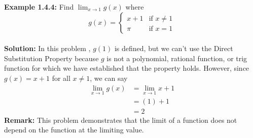 \documentclass{article}
\begin{document}
	\textbf{Example 1.4.4:} Find $\lim_{x \to 1}{g(x)}$ where
	$$g(x) =
	\begin{cases}
		x + 1 & \text{if } x \neq 1\\
		\pi & \text{if } x = 1
	\end{cases}$$ \\
	\textbf{Solution:} In this problem , $g(1)$ is defined, but we can't use the Direct Substitution Property because $g$ is not a polynomial, rational function, or trig function for which we have established that the property holds. However, since $g(x) = x + 1$ for all $x \neq 1$, we can say
	\begin{align*}
		\lim_{x \to 1}{g(x)} &= \lim_{x \to 1}{x + 1} \tag{Thrm 1.4.12} \\
		                     &= (1) + 1 \tag{Thrm 1.4.8} \\
		                     &= 2
	\end{align*}
	\textbf{Remark:} This problem demonstrates that the limit of a function does not depend on the function at the limiting value.
\end{document}
